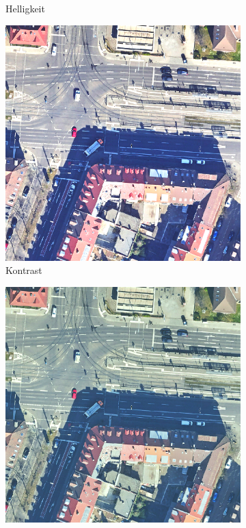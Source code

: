 \begin{figure}[h]
\begin{subfigure}{.32\textwidth}
		Helligkeit
	\end{subfigure} 
	\begin{subfigure}{.32\textwidth}
		\centering
		\includegraphics[width=1.\linewidth]{Bilder/color_aug/RandomContrast.png}
		Kontrast
	\end{subfigure} 
	\begin{subfigure}{.32\textwidth}
		\centering
		\includegraphics[width=1.\linewidth]{Bilder/color_aug/RGBShift.png}

\end{subfigure}
\end{figure}
